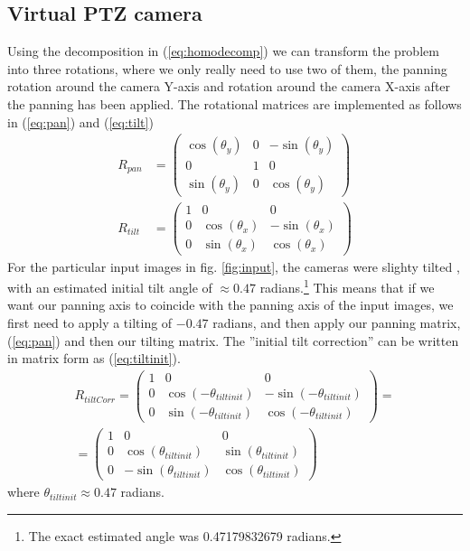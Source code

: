 \subsection{Virtual PTZ camera}
Using the decomposition in (\ref{eq:homodecomp}) we can transform the problem into three rotations, where we only really need to use two of them, the panning rotation around the camera Y-axis and rotation around the camera X-axis after the panning has been applied.
The rotational matrices are implemented as follows in (\ref{eq:pan}) and (\ref{eq:tilt})
	\begin{align}		
		R_{pan}&=\begin{pmatrix} 
			\cos(\theta_y) & 0 & -\sin(\theta_y) \\
			0 & 1 & 0 \\
			\sin(\theta_y) & 0 & \cos(\theta_y)
		\end{pmatrix} \label{eq:pan} \\
		R_{tilt} &=\begin{pmatrix}
			1 & 0 & 0 \\
			0 & \cos(\theta_x) & -\sin(\theta_x) \\
			0 & \sin(\theta_x) & \cos(\theta_x)
		\end{pmatrix} \label{eq:tilt}
	\end{align}
	For the particular input images in fig. \ref{fig:input}, the cameras were slighty tilted , with an estimated initial tilt angle of $\approx 0.47$ radians.\footnote{The exact estimated angle was 0.47179832679 radians.}
	This means that if we want our panning axis to coincide with the panning axis of the input images, we first need to apply a tilting of $-0.47$ radians, and then apply our panning matrix, (\ref{eq:pan}) and then our tilting matrix. 
	The ''initial tilt correction'' can be written in matrix form as (\ref{eq:tiltinit}).
	\begin{multline}
		R_{tiltCorr}=\begin{pmatrix}
			1 & 0 & 0 \\
			0 & \cos(-\theta_{tiltinit}) & -\sin(-\theta_{tiltinit}) \\
			0 & \sin(-\theta_{tiltinit}) & \cos(-\theta_{tiltinit})
		\end{pmatrix} = \\
		=\begin{pmatrix}
			1 & 0 & 0 \\
			0 & \cos(\theta_{tiltinit}) & \sin(\theta_{tiltinit}) \\
			0 & -\sin(\theta_{tiltinit}) & \cos(\theta_{tiltinit})
		\end{pmatrix}
		\label{eq:tiltinit}
	\end{multline}
	where $\theta_{tiltinit} \approx 0.47$ radians.

